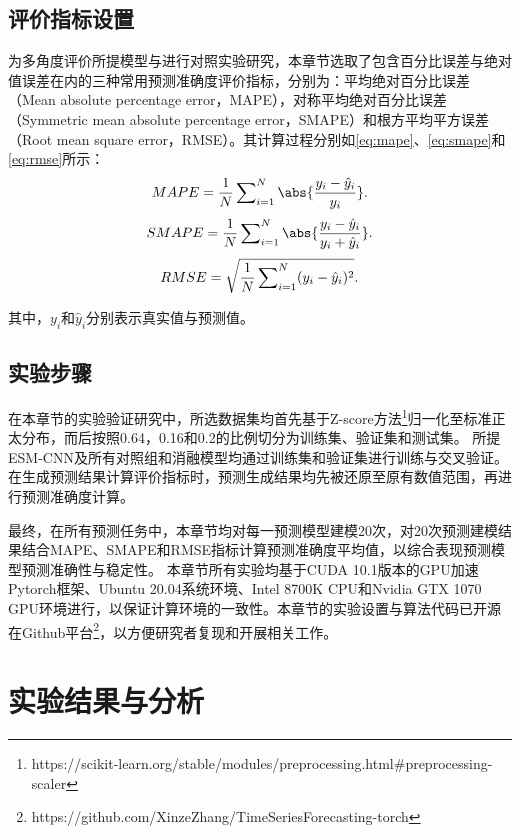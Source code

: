 \subsection{评价指标设置}
为多角度评价所提模型与进行对照实验研究，本章节选取了包含百分比误差与绝对值误差在内的三种常用预测准确度评价指标\cite{baoPSOMISMO2014,guo2016robust,zhaoDeep2017}，分别为：平均绝对百分比误差（Mean absolute percentage error，MAPE），对称平均绝对百分比误差（Symmetric mean absolute percentage error，SMAPE）和根方平均平方误差（Root mean square error，RMSE）。其计算过程分别如\autoref{eq:mape}、\autoref{eq:smape}和\autoref{eq:rmse}所示：
\begin{equation}
	\label{eq:mape}
	MAPE = \frac1N \sideset{}{_{i=1}^N} \sum \abs{\frac{y_{i} - \hat  y_{i}}{y_i}}.
\end{equation}
\begin{equation}
	\label{eq:smape}
	SMAPE = \frac1N \sideset{}{_{i=1}^N} \sum \abs{\frac{y_{i} - \hat  y_{i}}{y_i + \hat  y_{i}}}.
\end{equation}
\begin{equation}
	\label{eq:rmse}
	RMSE = \sqrt{\frac1N \sideset{}{_{i=1}^N} \sum ({y_{i} - \hat  y_{i}})^2 }.
\end{equation}

其中，$y_i$和$\hat y_i$分别表示真实值与预测值。

\subsection{实验步骤}
在本章节的实验验证研究中，所选数据集均首先基于Z-score方法\footnote{https://scikit-learn.org/stable/modules/preprocessing.html\#preprocessing-scaler}归一化至标准正太分布，而后按照0.64，0.16和0.2的比例切分为训练集、验证集和测试集。
所提ESM-CNN及所有对照组和消融模型均通过训练集和验证集进行训练与交叉验证。
在生成预测结果计算评价指标时，预测生成结果均先被还原至原有数值范围，再进行预测准确度计算。

最终，在所有预测任务中，本章节均对每一预测模型建模20次，对20次预测建模结果结合MAPE、SMAPE和RMSE指标计算预测准确度平均值，以综合表现预测模型预测准确性与稳定性。
本章节所有实验均基于CUDA 10.1版本的GPU加速Pytorch框架\cite{paszkePytorch2019}、Ubuntu 20.04系统环境、Intel 8700K CPU和Nvidia GTX 1070 GPU环境进行，以保证计算环境的一致性。本章节的实验设置与算法代码已开源在Github平台\footnote{https://github.com/XinzeZhang/TimeSeriesForecasting-torch}，以方便研究者复现和开展相关工作。



\section{实验结果与分析\label{sec:esm.ana}}
